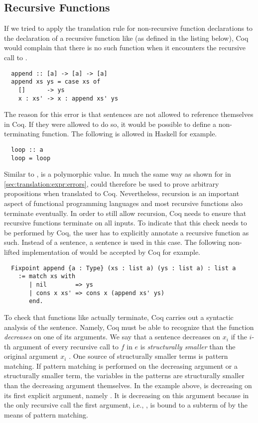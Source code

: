 \subsection{Recursive Functions} \label{sec:translation:func-decl:rec}
If we tried to apply the translation rule for non-recursive function declarations to the declaration of a recursive function like  (as defined in the listing below), Coq would complain that there is no such function when it encounters the recursive call to .
\begin{verbatim}
  append :: [a] -> [a] -> [a]
  append xs ys = case xs of
    []      -> ys
    x : xs' -> x : append xs' ys
\end{verbatim}
The reason for this error is that  sentences are not allowed to reference themselves in Coq.
If they were allowed to do so, it would be possible to define a non-terminating function.
The following is allowed in Haskell for example.
\begin{verbatim}
  loop :: a
  loop = loop
\end{verbatim}
Similar to ,  is a polymorphic value.
In much the same way as shown for  in \autoref{sec:translation:expr:errors},  could therefore be used to prove arbitrary propositions when translated to Coq.
Nevertheless, recursion is an important aspect of functional programming languages and most recursive functions also terminate eventually.
In order to still allow recursion, Coq needs to ensure that recursive functions terminate on all inputs.
To indicate that this check needs to be performed by Coq, the user has to explicitly annotate a recursive function as such.
Instead of a  sentence, a  sentence is used in this case.
The following non-lifted implementation of  would be accepted by Coq for example.
\begin{verbatim}
  Fixpoint append {a : Type} (xs : list a) (ys : list a) : list a
    := match xs with
       | nil        => ys
       | cons x xs' => cons x (append xs' ys)
       end.
\end{verbatim}
To check that functions like  actually terminate, Coq carries out a syntactic analysis of the  sentence.
Namely, Coq must be able to recognize that the function \textit{decreases} on one of its arguments.
We say that a  sentence  decreases on $x_i$ if the $i$-th argument of every recursive call to $f$ in $e$ is \textit{structurally smaller} than the original argument $x_i$ \cite[p.~111]{CoqDevTeam:2018}.
One source of structurally smaller terms is pattern matching.
If pattern matching is performed on the decreasing argument or a structurally smaller term, the variables in the patterns are structurally smaller than the decreasing argument themselves.
In the example above,  is decreasing on its first explicit argument, namely .
It is decreasing on this argument because in the only recursive call  the first argument, i.e., , is bound to a subterm of  by the means of pattern matching.

